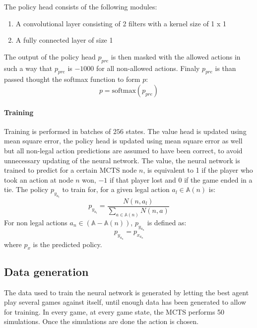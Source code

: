 \documentclass[12pt]{article}
\begin{document}
The policy head consists of the following modules:
\begin{enumerate}
\item A convolutional layer consisting of 2 filters with a kernel size of 1 x 1
\item A fully connected layer of size 1
\end{enumerate}
The output of the policy head \(p_{pre}\) is then masked with the allowed actions in such a way that \(p_{pre}\) is \(-1000\) for all non-allowed actions. Finaly \(p_{pre}\) is than passed thought the softmax function to form \(p\):
\begin{equation}\label{eq:nn:policyDefinition}
p = \text{softmax}(p_{pre})
\end{equation}

\paragraph{Training}\label{sec:Methods:NN:A0:Training}
Training is performed in batches of \(256\) states. The value head is updated using mean square error, the policy head is updated using mean square error as well but all non-legal action predictions are assumed to have been correct, to avoid unnecessary updating of the neural network. The value, the neural network is trained to predict for a certain MCTS node \(n\), is equivalent to 1 if the player who took an action at node \(n\) won, \(-1\) if that player lost and \(0\) if the game ended in a tie. The policy \(p_{y_{a_l}}\) to train for, for a given legal action \(a_l \in \mathbb A(n)\) is:
\begin{equation} \label{eq:NN:policy_computation}
p_{y_{a_l}} = \frac{N(n, a_l)}{\sum_{a\in \mathbb A(n)} N(n, a)}
\end{equation}
For non legal actions \(a_n \in (\mathbb A - \mathbb A(n))\), \(p_{y_{a_n}}\) is defined as:
\begin{equation} \label{eq:NN:policy_computation_nonlegal}
p_{y_{a_n}} = p_{x_{a_n}} 
\end{equation}
where \(p_x\) is the predicted policy.


\subsection{Data generation}
The data used to train the neural network is generated by letting the best agent play several games against itself, until enough data has been generated to allow for training. In every game, at every game state, the MCTS performs 50 simulations. Once the simulations are done the action is chosen.
\end{document}
